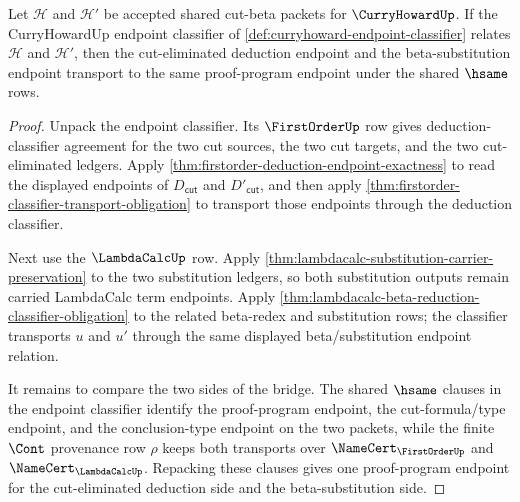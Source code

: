 \begin{theorem}\label{thm:curryhoward-classifier-endpoint-transport}
Let $\mathcal H$ and $\mathcal H'$ be accepted shared cut-beta packets for $\CurryHowardUp$. If the CurryHowardUp endpoint classifier of \autoref{def:curryhoward-endpoint-classifier} relates $\mathcal H$ and $\mathcal H'$, then the cut-eliminated deduction endpoint and the beta-substitution endpoint transport to the same proof-program endpoint under the shared $\hsame$ rows.
\end{theorem}
\begin{proof}
Unpack the endpoint classifier. Its $\FirstOrderUp$ row gives deduction-classifier agreement for the two cut sources, the two cut targets, and the two cut-eliminated ledgers. Apply \autoref{thm:firstorder-deduction-endpoint-exactness} to read the displayed endpoints of $D_{\mathsf{cut}}$ and $D'_{\mathsf{cut}}$, and then apply \autoref{thm:firstorder-classifier-transport-obligation} to transport those endpoints through the deduction classifier.

Next use the $\LambdaCalcUp$ row. Apply \autoref{thm:lambdacalc-substitution-carrier-preservation} to the two substitution ledgers, so both substitution outputs remain carried LambdaCalc term endpoints. Apply \autoref{thm:lambdacalc-beta-reduction-classifier-obligation} to the related beta-redex and substitution rows; the classifier transports $u$ and $u'$ through the same displayed beta/substitution endpoint relation.

It remains to compare the two sides of the bridge. The shared $\hsame$ clauses in the endpoint classifier identify the proof-program endpoint, the cut-formula/type endpoint, and the conclusion-type endpoint on the two packets, while the finite $\Cont$ provenance row $\rho$ keeps both transports over $\NameCert_{\FirstOrderUp}$ and $\NameCert_{\LambdaCalcUp}$. Repacking these clauses gives one proof-program endpoint for the cut-eliminated deduction side and the beta-substitution side.
\end{proof}

